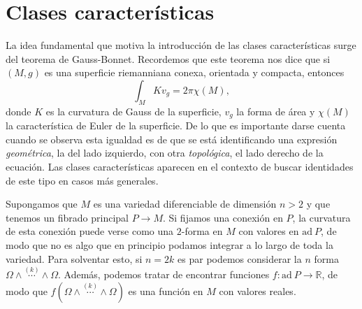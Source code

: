 \documentclass[12pt,a4paper]{article}
\theoremstyle{definition} \newtheorem{defn}[thm]{Definición}
\theoremstyle{definition} \newtheorem{ejemplo}[thm]{Ejemplo}
\theoremstyle{definition} \newtheorem{ejercicio}[thm]{Ejercicio}
\theoremstyle{remark} \newtheorem*{obs}{Observación}
\def\ad{\mathrm{ad}}
\def\RR{\mathbb{R}}
\begin{document}
	\section{Clases características}
	La idea fundamental que motiva la introducción de las clases características surge del teorema de Gauss-Bonnet. Recordemos que este teorema nos dice que si $(M,g)$ es una superficie riemanniana conexa, orientada y compacta, entonces
	\begin{equation*}
	  \int_M K v_g = 2\pi \chi(M),
	\end{equation*}
	donde $K$ es la curvatura de Gauss de la superficie, $v_g$ la forma de área y $\chi(M)$ la característica de Euler de la superficie. De lo que es importante darse cuenta cuando se observa esta igualdad es de que se está identificando una expresión \textit{geométrica}, la del lado izquierdo, con otra \textit{topológica}, el lado derecho de la ecuación. Las clases características aparecen en el contexto de buscar identidades de este tipo en casos más generales. 

	Supongamos que $M$ es una variedad diferenciable de dimensión $n>2$ y que tenemos un fibrado principal $P\rightarrow M$. Si fijamos una conexión en $P$, la curvatura de esta conexión puede verse como una $2$-forma en $M$ con valores en $\ad\ P$, de modo que no es algo que en principio podamos integrar a lo largo de toda la variedad. Para solventar esto, si $n=2k$ es par podemos considerar la $n$ forma $\Omega\wedge \overset{(k)}{\cdots} \wedge \Omega$. Además, podemos tratar de encontrar funciones $f: \ad\ P \rightarrow \RR$, de modo que $f(\Omega\wedge \overset{(k)}{\cdots} \wedge \Omega)$ es una función en $M$ con valores reales.
\end{document}
